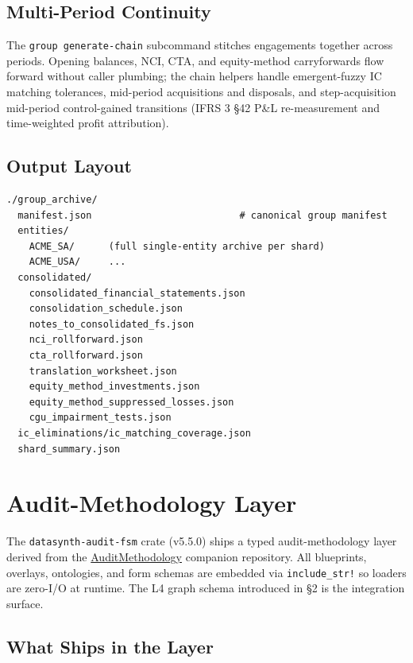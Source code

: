 \documentclass[11pt,a4paper]{article}
\begin{document}
\subsection{Multi-Period Continuity}

The \texttt{group generate-chain} subcommand stitches engagements together
across periods. Opening balances, NCI, CTA, and equity-method carryforwards
flow forward without caller plumbing; the chain helpers handle
emergent-fuzzy IC matching tolerances, mid-period acquisitions and
disposals, and step-acquisition mid-period control-gained transitions
(IFRS 3 \S{}42 P\&L re-measurement and time-weighted profit attribution).

\subsection{Output Layout}

\begin{tcolorbox}[notebox={Per-engagement archive}]
\small
\begin{verbatim}
./group_archive/
  manifest.json                          # canonical group manifest
  entities/
    ACME_SA/      (full single-entity archive per shard)
    ACME_USA/     ...
  consolidated/
    consolidated_financial_statements.json
    consolidation_schedule.json
    notes_to_consolidated_fs.json
    nci_rollforward.json
    cta_rollforward.json
    translation_worksheet.json
    equity_method_investments.json
    equity_method_suppressed_losses.json
    cgu_impairment_tests.json
  ic_eliminations/ic_matching_coverage.json
  shard_summary.json
\end{verbatim}
\end{tcolorbox}

\newpage
\section{Audit-Methodology Layer}

The \texttt{datasynth-audit-fsm} crate (v5.5.0) ships a typed
audit-methodology layer derived from the
\href{https://github.com/mivertowski/AuditMethodology}{AuditMethodology}
companion repository. All blueprints, overlays, ontologies, and form
schemas are embedded via \texttt{include\_str!} so loaders are zero-I/O at
runtime. The L4 graph schema introduced in \S{}2 is the integration surface.

\subsection{What Ships in the Layer}
\end{document}
